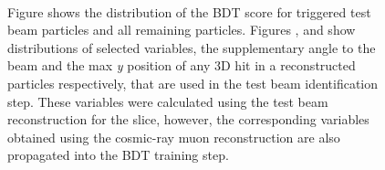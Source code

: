 \begin{figure}
\centering
{} \\
\caption{Figure \protect{} shows the distribution of the BDT score for triggered test beam particles and all remaining particles.  Figures \protect{}, and \protect{} show distributions of selected variables, the supplementary angle to the beam and the max \textit{y} position of any 3D hit in a reconstructed particles respectively, that are used in the test beam identification step.  These variables were calculated using the test beam reconstruction for the slice, however, the corresponding variables obtained using the cosmic-ray muon reconstruction are also propagated into the BDT training step.}
\label{fig:bdtid}
\end{figure}

